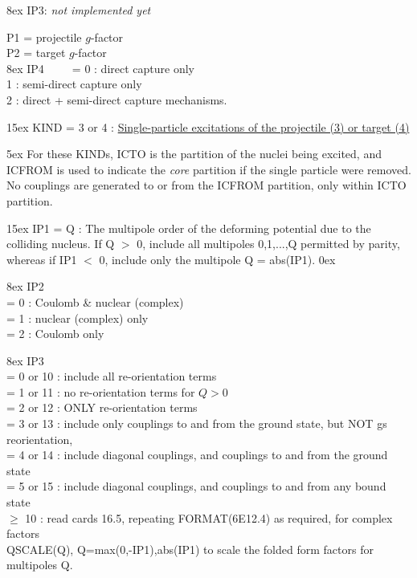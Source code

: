 \documentclass[11pt]{article}
\begin{document}
\hangindent 8ex  IP3:  {\em not implemented yet}


 P1  = projectile $g$-factor  \\
 P2  = target $g$-factor  \\

\hangindent 8ex  IP4 
~  ~~   = 0 : direct capture only
\\    1 : semi-direct capture only
\\    2 : direct + semi-direct capture mechanisms.

\bigskip

\hangindent 15ex
KIND = 3 or 4 :
\underline{Single-particle excitations of the projectile (3) or target (4)}


\hangindent 5ex
 For these KINDs, ICTO is the partition of the nuclei being excited,
and ICFROM is used to indicate the
{\em core} partition if the single particle were removed.  No couplings are
generated to or from the ICFROM partition, only within ICTO partition.

\hangindent 15ex
 IP1 = Q : The multipole order of the deforming potential due to
the colliding nucleus. If Q $>$ 0, include all multipoles 0,1,...,Q
permitted by parity, whereas if IP1 $<$ 0, include only the multipole
Q = abs(IP1).
%
\hangindent 0ex

\hangindent 8ex
IP2
\\   = 0 : Coulomb \& nuclear (complex)
\\  = 1 : nuclear (complex) only
\\  = 2 : Coulomb only



\hangindent 8ex  IP3
\\  = 0 or 10 : include all re-orientation terms
\\  = 1 or 11 : no re-orientation terms for $Q > 0$
\\  = 2 or 12 : ONLY re-orientation terms
\\  = 3 or 13 : include only couplings to and from the ground state,
    but NOT gs reorientation,
\\  = 4 or 14 : include diagonal couplings,
                and  couplings to and from the ground state
\\  = 5 or 15 : include diagonal couplings,
                and  couplings to and from any bound state
\\  $\geq$ 10      : read cards 16.5,
repeating FORMAT(6E12.4) as required, for
complex factors \\QSCALE(Q), Q=max(0,-IP1),abs(IP1)
to scale the folded form factors for multipoles Q.
\end{document}
